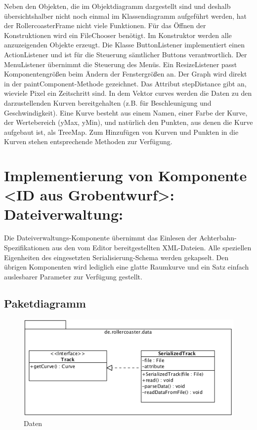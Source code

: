Neben den Objekten, die im Objektdiagramm dargestellt sind und deshalb übersichtshalber nicht noch einmal im Klassendiagramm aufgeführt werden, hat der RollercoasterFrame nicht viele Funktionen. Für das Öffnen der Konstruktionen wird ein FileChooser benötigt. Im Konstruktor werden alle anzuzeigenden Objekte erzeugt. Die Klasse ButtonListener implementiert einen ActionListener und ist für die Steuerung sämtlicher Buttons verantwortlich. Der MenuListener übernimmt die Steuerung des Menüs. Ein ResizeListener passt Komponentengrößen beim Ändern der Fenstergrößen an.
Der Graph wird direkt in der paintComponent-Methode gezeichnet. Das Attribut stepDistance gibt an, wieviele Pixel ein Zeitschritt sind. In dem Vektor curves werden die Daten zu den darzustellenden Kurven bereitgehalten (z.B. für Beschleunigung und Geschwindigkeit). Eine Kurve besteht aus einem Namen, einer Farbe der Kurve, der Wertebereich (yMax, yMin), und natürlich den Punkten, aus denen die Kurve aufgebaut ist, als TreeMap. Zum Hinzufügen von Kurven und Punkten in die Kurven stehen entsprechende Methoden zur Verfügung.

\section{Implementierung von Komponente
         <ID aus Grobentwurf>: Dateiverwaltung:}

Die Dateiverwaltungs-Komponente übernimmt das Einlesen der Achterbahn-Spezifikationen 
aus den vom Editor bereitgestellten XML-Dateien. Alle speziellen Eigenheiten des
eingesetzten Serialisierung-Schema werden gekapselt. Den übrigen Komponenten wird 
lediglich eine glatte Raumkurve und ein Satz einfach auslesbarer Parameter zur Verfügung
gestellt.

\subsection{Paketdiagramm}

\begin{figure}
\includegraphics[width=\linewidth]{bilder/Data}
\caption{Daten}
\end{figure}

